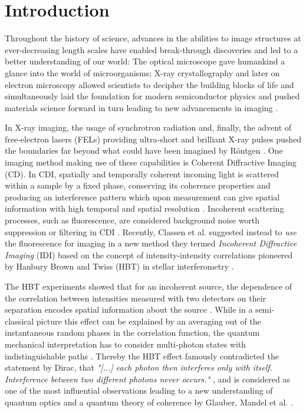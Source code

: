 \chapter{Introduction}
Throughout the history of science, advances in the abilities to image structures at ever-decreasing length scales have enabled break-through discoveries and led to a better understanding of our world:
The optical microscope gave humankind a glance into the world of microorganisms; X-ray crystallography and later on electron microscopy allowed scientists to decipher the building blocks of life and simultaneously laid the foundation for modern semiconductor physics and pushed materials science forward
in turn leading to new advancements in imaging  \cite{hooke1665,laue1915,ruska1939,watson1953,hovmoeller1984}. 

In X-ray imaging, the usage of synchrotron radiation and, finally, the advent of free-electron lasers (FELs) providing ultra-short and brilliant X-ray pulses pushed the boundaries far beyond what could have been imagined by Röntgen \cite{cloetens1996,emma2010}. One imaging method making use of these capabilities is Coherent Diffractive Imaging (CD). In CDI, spatially and temporally coherent incoming light is scattered within a sample by a fixed phase, conserving its coherence properties and producing an interference pattern which upon measurement can give spatial information with high temporal and spatial resolution \cite{seibert2011,bostedt2010,barke2015}. Incoherent scattering processes, such as fluorescence, are considered background noise worth suppression or filtering in CDI \cite{schultz2013chapter7}.  Recently, Classen et al. suggested instead to \textit{use} the fluorescence for imaging in a new method they termed \textit{Incoherent Diffractive Imaging} (IDI) based on the concept of intensity-intensity correlations pioneered by Hanbury Brown and Twiss (HBT) in stellar interferometry \cite{classen2017,hanbury1956}. 

The HBT experiments showed that for an incoherent source, the dependence of the correlation between intensities measured with two detectors on their separation encodes spatial information about the source \cite{baym1997}. While in a semi-classical picture this effect can be explained by an averaging out of the instantaneous random phases in the correlation function, the quantum mechanical interpretation has to consider multi-photon states with indistinguishable paths \cite{fano1961,glauber2006}. Thereby the HBT effect famously contradicted the statement by Dirac, that \textit{"[...] each photon then interferes only with itself. Interference between two different photons never occurs."} \cite{dirac1958}, and is considered as one of the most influential observations leading to a new understanding of quantum optics and a quantum theory of coherence by Glauber, Mandel et al. \cite{glauber1963,mandel1959, hong1987}.

